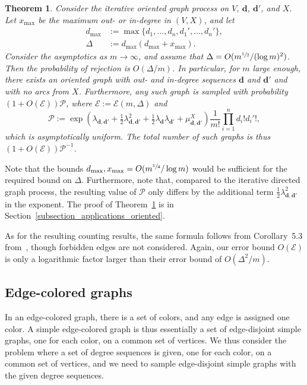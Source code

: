 \documentclass{article}
\theoremstyle{plain}
\newtheorem{theorem}{Theorem}[section]
\theoremstyle{remark}
\theoremstyle{plain}
\numberwithin{equation}{section}
\renewcommand{\d}{{\boldsymbol{d}}}
\begin{document}
	\begin{theorem}\label{theorem_oriented}
		Consider the iterative oriented graph process on $V$, $\d$, $\d'$, and $X$. Let $x_{\max}$ be the maximum out- or in-degree in $(V,X)$, and let
		\begin{align}
			d_{\max}&:=\max\{d_1,\ldots,d_n,d_1',\ldots,d_{n}'\},
			\\\Delta&:=d_{\max}(d_{\max}+x_{\max}).
		\end{align}
		Consider the asymptotics as $m\to\infty$, and assume that $\Delta=O(m^{\sfrac12}/(\log m)^2)$. Then the probability of rejection is $O(\Delta/m)$. In particular, for $m$ large enough, there exists an oriented graph with out- and in-degree sequences $\d$ and $\d'$ and with no arcs from $X$. Furthermore, any such graph is sampled with probability $(1+O(\mathscr{E}))\mathscr{P}$, where $\mathscr{E}:=\mathscr{E}(m,\Delta)$ and $$\mathscr{P}:=\exp(\lambda_{\d,\d'}+\tfrac12\lambda_{\d,\d'}^2+\tfrac12\lambda_{\d}\lambda_{\d'}+\mu_{\d,\d'}^{X})\frac1{m!}\prod_{i=1}^{n}d_i!d_i'!,$$ which is asymptotically uniform. The total number of such graphs is thus $(1+O(\mathscr{E}))\mathscr{P}^{-1}$.
	\end{theorem}
	
	Note that the bounds $d_{\max},x_{\max}=O(m^{\sfrac14}/\log m)$ would be sufficient for the required bound on $\Delta$. Furthermore, note that, compared to the iterative directed graph process, the resulting value of $\mathscr{P}$ only differs by the additional term $\frac12\lambda_{\d,\d'}^2$ in the exponent. The proof of Theorem~\ref{theorem_oriented} is in Section~\ref{subsection_applications_oriented}.
	
	As for the resulting counting results, the same formula follows from Corollary~5.3 from~\cite{greenhill2026asymptoticenumerationconstrainedbipartite}, though forbidden edges are not considered. Again, our error bound $O(\mathscr{E})$ is only a logarithmic factor larger than their error bound of $O(\Delta^2/m)$.
	
	\subsection{Edge-colored graphs}\label{subsection_results_colored}
	
	In an edge-colored graph, there is a set of colors, and any edge is assigned one color. A simple edge-colored graph is thus essentially a set of edge-disjoint simple graphs, one for each color, on a common set of vertices. We thus consider the problem where a set of degree sequences is given, one for each color, on a common set of vertices, and we need to sample edge-disjoint simple graphs with the given degree sequences.
	
\end{document}
